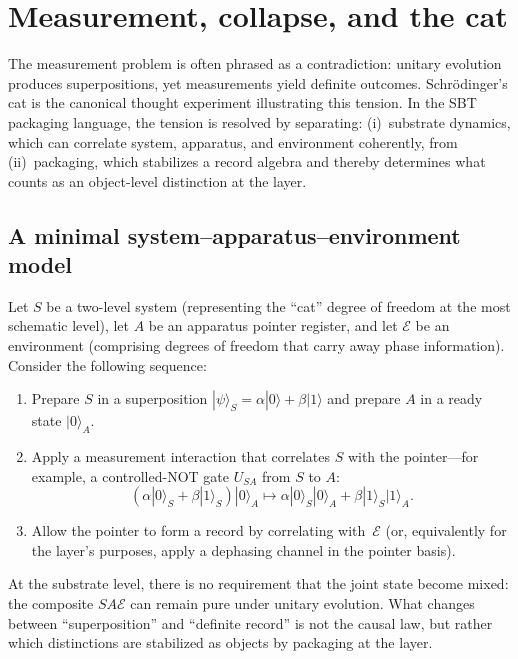 \section{Measurement, collapse, and the cat}\label{sec:cat}

The measurement problem is often phrased as a contradiction: unitary evolution produces superpositions, yet measurements yield definite outcomes.
Schr{\"o}dinger's cat is the canonical thought experiment illustrating this tension.\cite{Schrodinger1935PresentSituation}
In the SBT packaging language, the tension is resolved by separating:
(i)~substrate dynamics, which can correlate system, apparatus, and environment coherently, from
(ii)~packaging, which stabilizes a record algebra and thereby determines what counts as an object-level distinction at the layer.

\subsection{A minimal system--apparatus--environment model}

Let $S$ be a two-level system (representing the ``cat'' degree of freedom at the most schematic level), let $A$ be an apparatus pointer register, and let $\mathcal{E}$ be an environment (comprising degrees of freedom that carry away phase information).
Consider the following sequence:
\begin{enumerate}
  \item Prepare $S$ in a superposition $|\psi\rangle_S = \alpha|0\rangle + \beta|1\rangle$ and prepare $A$ in a ready state $|0\rangle_A$.
  \item Apply a measurement interaction that correlates $S$ with the pointer---for example, a controlled-NOT gate $U_{SA}$ from $S$ to $A$:
  \[
  (\alpha|0\rangle_S+\beta|1\rangle_S)|0\rangle_A \mapsto \alpha|0\rangle_S|0\rangle_A + \beta|1\rangle_S|1\rangle_A.
  \]
  \item Allow the pointer to form a record by correlating with~$\mathcal{E}$ (or, equivalently for the layer's purposes, apply a dephasing channel in the pointer basis).
\end{enumerate}

At the substrate level, there is no requirement that the joint state become mixed: the composite $SA\mathcal{E}$ can remain pure under unitary evolution.
What changes between ``superposition'' and ``definite record'' is not the causal law, but rather which distinctions are stabilized as objects by packaging at the layer.

